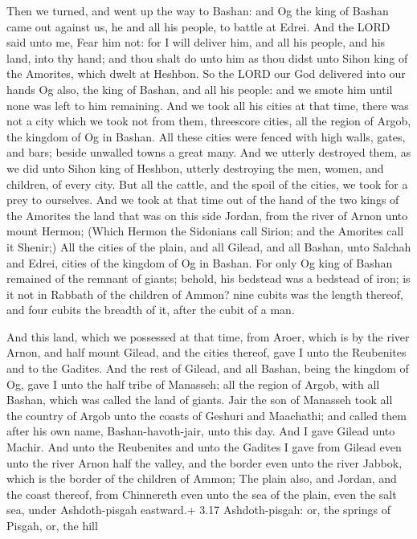  Then we turned, and went up the way to Bashan: and Og the
king of Bashan came out against us, he and all his people, to battle at
Edrei.  And the LORD said unto me, Fear him not: for I will
deliver him, and all his people, and his land, into thy hand; and thou
shalt do unto him as thou didst unto Sihon king of the Amorites, which
dwelt at Heshbon.  So the LORD our God delivered into our
hands Og also, the king of Bashan, and all his people: and we smote him
until none was left to him remaining.  And we took all his
cities at that time, there was not a city which we took not from them,
threescore cities, all the region of Argob, the kingdom of Og in Bashan.
 All these cities were fenced with high walls, gates, and
bars; beside unwalled towns a great many.  And we utterly
destroyed them, as we did unto Sihon king of Heshbon, utterly destroying
the men, women, and children, of every city.  But all the
cattle, and the spoil of the cities, we took for a prey to ourselves.
 And we took at that time out of the hand of the two kings
of the Amorites the land that was on this side Jordan, from the river of
Arnon unto mount Hermon;  (Which Hermon the Sidonians call
Sirion; and the Amorites call it Shenir;)  All the cities
of the plain, and all Gilead, and all Bashan, unto Salchah and Edrei,
cities of the kingdom of Og in Bashan.  For only Og king of
Bashan remained of the remnant of giants; behold, his bedstead was a
bedstead of iron; is it not in Rabbath of the children of Ammon? nine
cubits was the length thereof, and four cubits the breadth of it, after
the cubit of a man.

 And this land, which we possessed at that time, from
Aroer, which is by the river Arnon, and half mount Gilead, and the
cities thereof, gave I unto the Reubenites and to the Gadites.
 And the rest of Gilead, and all Bashan, being the kingdom
of Og, gave I unto the half tribe of Manasseh; all the region of Argob,
with all Bashan, which was called the land of giants.  Jair
the son of Manasseh took all the country of Argob unto the coasts of
Geshuri and Maachathi; and called them after his own name,
Bashan-havoth-jair, unto this day.  And I gave Gilead unto
Machir.  And unto the Reubenites and unto the Gadites I
gave from Gilead even unto the river Arnon half the valley, and the
border even unto the river Jabbok, which is the border of the children
of Ammon;  The plain also, and Jordan, and the coast
thereof, from Chinnereth even unto the sea of the plain, even the salt
sea, under Ashdoth-pisgah eastward.+ 3.17 Ashdoth-pisgah: or, the
springs of Pisgah, or, the hill

